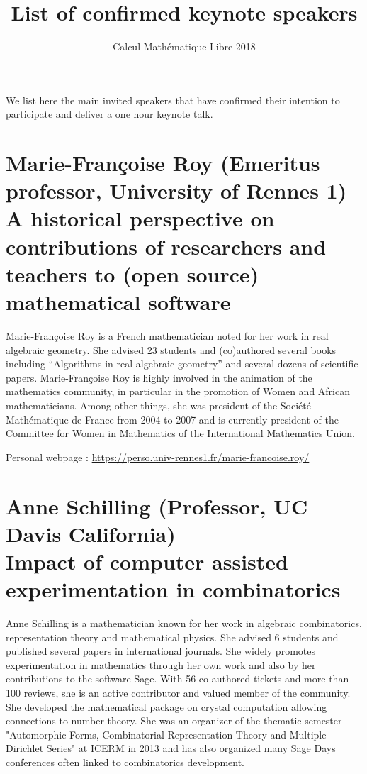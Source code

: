 \documentclass{paper}
\title{List of confirmed keynote speakers}
\subtitle{Calcul Mathématique Libre 2018}
\date{}
\newcommand{\orateur}[3]{%
  \section*{%
    #1 {\small(#2)}\nopagebreak\\
    #3}
}
\begin{document}
\maketitle
\thispagestyle{empty}

We list here the main invited speakers that have confirmed their
intention to participate and deliver a one hour keynote talk.



\orateur
{Marie-Françoise Roy}
{Emeritus professor, University of Rennes 1}
{A historical perspective on contributions of researchers and teachers
  to (open source) mathematical software}

Marie-Françoise Roy is a French mathematician noted for her work in
real algebraic geometry. She advised 23 students and (co)authored
several books including ``Algorithms in real algebraic geometry'' and
several dozens of scientific papers. Marie-Françoise Roy is highly
involved in the animation of the mathematics community, in particular
in the promotion of Women and African mathematicians. Among other
things, she was president of the Société Mathématique de France from
2004 to 2007 and is currently president of the Committee for Women in
Mathematics of the International Mathematics Union.

\medskip

Personal webpage : \url{https://perso.univ-rennes1.fr/marie-francoise.roy/}

\orateur
{Anne Schilling}
{Professor, UC Davis California}
{Impact of computer assisted experimentation in combinatorics}

Anne Schilling is a mathematician known for her work in algebraic combinatorics, 
representation theory and mathematical physics. She advised 6 students and published
several papers in international journals. She widely promotes experimentation 
in mathematics through her own work and also by her contributions to
the software Sage. With 56 co-authored tickets and more than 100 reviews, she
is an active contributor and valued member of the community. She developed 
the mathematical package on crystal computation allowing connections to number
theory. She was an organizer of the thematic semester "Automorphic Forms, 
Combinatorial Representation Theory and Multiple Dirichlet Series" at ICERM
in 2013 and has also organized many Sage Days conferences often linked to 
combinatorics development.
\end{document}
